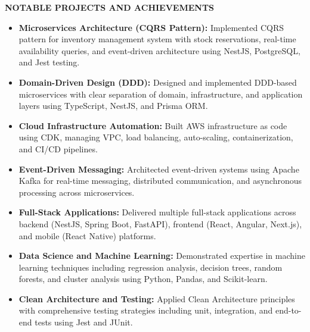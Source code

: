 \documentclass[11pt,letterpaper]{article}
\newcommand{\sectiontitle}[1]{
  {\large\textbf{#1}}
  \vspace{3pt}
}
\begin{document}
\sectiontitle{NOTABLE PROJECTS AND ACHIEVEMENTS}

\begin{itemize}
  \setlength{\itemsep}{0pt}
  \setlength{\parskip}{3pt}
  \item \textbf{Microservices Architecture (CQRS Pattern):} Implemented CQRS pattern for inventory management system with stock reservations, real-time availability queries, and event-driven architecture using NestJS, PostgreSQL, and Jest testing.
  \item \textbf{Domain-Driven Design (DDD):} Designed and implemented DDD-based microservices with clear separation of domain, infrastructure, and application layers using TypeScript, NestJS, and Prisma ORM.
  \item \textbf{Cloud Infrastructure Automation:} Built AWS infrastructure as code using CDK, managing VPC, load balancing, auto-scaling, containerization, and CI/CD pipelines.
  \item \textbf{Event-Driven Messaging:} Architected event-driven systems using Apache Kafka for real-time messaging, distributed communication, and asynchronous processing across microservices.
  \item \textbf{Full-Stack Applications:} Delivered multiple full-stack applications across backend (NestJS, Spring Boot, FastAPI), frontend (React, Angular, Next.js), and mobile (React Native) platforms.
  \item \textbf{Data Science and Machine Learning:} Demonstrated expertise in machine learning techniques including regression analysis, decision trees, random forests, and cluster analysis using Python, Pandas, and Scikit-learn.
  \item \textbf{Clean Architecture and Testing:} Applied Clean Architecture principles with comprehensive testing strategies including unit, integration, and end-to-end tests using Jest and JUnit.
\end{itemize}
\end{document}
